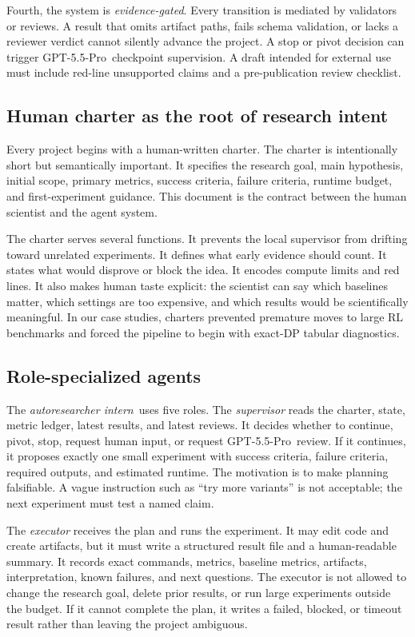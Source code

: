 \documentclass{article}
\newcommand{\intern}{\emph{autoresearcher intern}}
\newcommand{\gptpro}{GPT-5.5-Pro}
\begin{document}
Fourth, the system is \emph{evidence-gated}. Every transition is mediated by validators or reviews. A result that omits artifact paths, fails schema validation, or lacks a reviewer verdict cannot silently advance the project. A stop or pivot decision can trigger \gptpro\ checkpoint supervision. A draft intended for external use must include red-line unsupported claims and a pre-publication review checklist.

\subsection{Human charter as the root of research intent}

Every project begins with a human-written charter. The charter is intentionally short but semantically important. It specifies the research goal, main hypothesis, initial scope, primary metrics, success criteria, failure criteria, runtime budget, and first-experiment guidance. This document is the contract between the human scientist and the agent system.

The charter serves several functions. It prevents the local supervisor from drifting toward unrelated experiments. It defines what early evidence should count. It states what would disprove or block the idea. It encodes compute limits and red lines. It also makes human taste explicit: the scientist can say which baselines matter, which settings are too expensive, and which results would be scientifically meaningful. In our case studies, charters prevented premature moves to large RL benchmarks and forced the pipeline to begin with exact-DP tabular diagnostics.

\subsection{Role-specialized agents}

The \intern\ uses five roles. The \emph{supervisor} reads the charter, state, metric ledger, latest results, and latest reviews. It decides whether to continue, pivot, stop, request human input, or request \gptpro\ review. If it continues, it proposes exactly one small experiment with success criteria, failure criteria, required outputs, and estimated runtime. The motivation is to make planning falsifiable. A vague instruction such as ``try more variants'' is not acceptable; the next experiment must test a named claim.

The \emph{executor} receives the plan and runs the experiment. It may edit code and create artifacts, but it must write a structured result file and a human-readable summary. It records exact commands, metrics, baseline metrics, artifacts, interpretation, known failures, and next questions. The executor is not allowed to change the research goal, delete prior results, or run large experiments outside the budget. If it cannot complete the plan, it writes a failed, blocked, or timeout result rather than leaving the project ambiguous.
\end{document}
